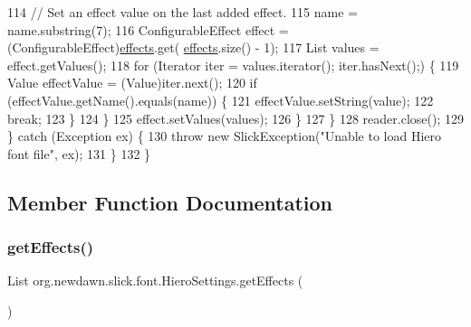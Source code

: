 \begin{DoxyCode}
114                     \textcolor{comment}{// Set an effect value on the last added effect.}
115                     name = name.substring(7);
116                     ConfigurableEffect effect = (ConfigurableEffect)\mbox{\hyperlink{classorg_1_1newdawn_1_1slick_1_1font_1_1_hiero_settings_ad1134cfcc8c0f5d582f8abe54d7eeb80}{effects}}.get(
      \mbox{\hyperlink{classorg_1_1newdawn_1_1slick_1_1font_1_1_hiero_settings_ad1134cfcc8c0f5d582f8abe54d7eeb80}{effects}}.size() - 1);
117                     List values = effect.getValues();
118                     \textcolor{keywordflow}{for} (Iterator iter = values.iterator(); iter.hasNext();) \{
119                         Value effectValue = (Value)iter.next();
120                         \textcolor{keywordflow}{if} (effectValue.getName().equals(name)) \{
121                             effectValue.setString(value);
122                             \textcolor{keywordflow}{break};
123                         \}
124                     \}
125                     effect.setValues(values);
126                 \}
127             \}
128             reader.close();
129         \} \textcolor{keywordflow}{catch} (Exception ex) \{
130             \textcolor{keywordflow}{throw} \textcolor{keyword}{new} SlickException(\textcolor{stringliteral}{"Unable to load Hiero font file"}, ex);
131         \}
132     \}
\end{DoxyCode}


\subsection{Member Function Documentation}
\mbox{\label{classorg_1_1newdawn_1_1slick_1_1font_1_1_hiero_settings_ae36e58c19489429b83deb278cb74afb3}} 
\subsubsection{\texorpdfstring{get\+Effects()}{getEffects()}}
{\footnotesize\ttfamily List org.\+newdawn.\+slick.\+font.\+Hiero\+Settings.\+get\+Effects (\begin{DoxyParamCaption}{ }\end{DoxyParamCaption})\hspace{0.3cm}{\ttfamily [inline]}}

